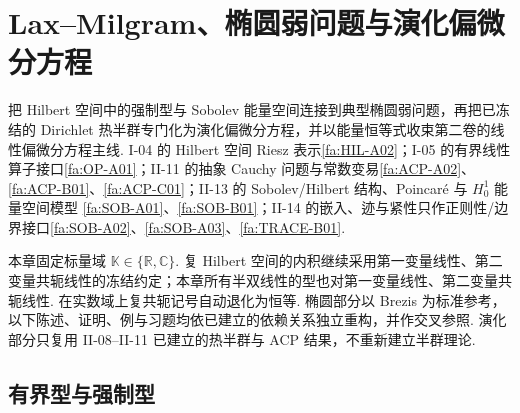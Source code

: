 \chapter{Lax--Milgram、椭圆弱问题与演化偏微分方程}\label{chap:II-15}
\FAChapterOpening
{把 Hilbert 空间中的强制型与 Sobolev 能量空间连接到典型椭圆弱问题，再把已冻结的 Dirichlet 热半群专门化为演化偏微分方程，并以能量恒等式收束第二卷的线性偏微分方程主线.}
{I-04 的 Hilbert 空间 Riesz 表示\autoref{fa:HIL-A02}；I-05 的有界线性算子接口\autoref{fa:OP-A01}；II-11 的抽象 Cauchy 问题与常数变易\autoref{fa:ACP-A02}、\autoref{fa:ACP-B01}、\autoref{fa:ACP-C01}；II-13 的 Sobolev/Hilbert 结构、Poincaré 与 \(\displaystyle H_0^1\) 能量空间模型 \autoref{fa:SOB-A01}、\autoref{fa:SOB-B01}；II-14 的嵌入、迹与紧性只作正则性/边界接口\autoref{fa:SOB-A02}、\autoref{fa:SOB-A03}、\autoref{fa:TRACE-B01}.}
{\begin{center}
\end{center}}

本章固定标量域 \(\displaystyle\mathbb K\in\{\mathbb R,\mathbb C\}\). 复 Hilbert 空间的内积继续采用第一变量线性、第二变量共轭线性的冻结约定；本章所有半双线性的型也对第一变量线性、第二变量共轭线性. 在实数域上复共轭记号自动退化为恒等. 椭圆部分以 Brezis 为标准参考，以下陈述、证明、例与习题均依已建立的依赖关系独立重构，并作交叉参照\cite{brezis2011}. 演化部分只复用 II-08--II-11 已建立的热半群与 ACP 结果，不重新建立半群理论.

\section{有界型与强制型}\label{sec:ii15-bounded-coercive}

